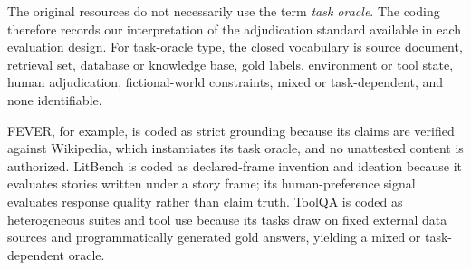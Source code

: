 \documentclass{clv2025}
\begin{document}
The original resources do not necessarily use the term \emph{task oracle}.
The coding therefore records our interpretation of the adjudication standard
available in each evaluation design.
For task-oracle type, the closed vocabulary is source document, retrieval set,
database or knowledge base, gold labels, environment or tool state, human
adjudication, fictional-world constraints, mixed or task-dependent, and none
identifiable.

FEVER, for example, is coded as strict grounding because its claims are
verified against Wikipedia, which instantiates its task oracle, and no
unattested content is authorized. LitBench is coded as declared-frame
invention and ideation because it evaluates stories written under a story
frame; its human-preference signal evaluates response quality rather than
claim truth. ToolQA is coded as heterogeneous suites and tool use because its
tasks draw on fixed external data sources and programmatically generated gold
answers, yielding a mixed or task-dependent oracle.
\end{document}
